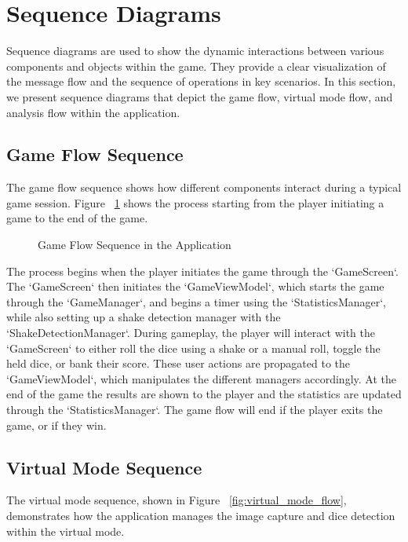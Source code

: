 \section{Sequence Diagrams}

Sequence diagrams are used to show the dynamic interactions between various components and objects within the game. They provide a clear visualization of the message flow and the sequence of operations in key scenarios. In this section, we present sequence diagrams that depict the game flow, virtual mode flow, and analysis flow within the application.

\subsection{Game Flow Sequence}

The game flow sequence shows how different components interact during a typical game session. Figure ~\ref{fig:game_flow} shows the process starting from the player initiating a game to the end of the game.

\begin{figure}[ht!]
    \centering
    
    \caption{Game Flow Sequence in the Application}
    \label{fig:game_flow}
\end{figure}

The process begins when the player initiates the game through the `GameScreen`. The `GameScreen` then initiates the `GameViewModel`, which starts the game through the `GameManager`, and begins a timer using the `StatisticsManager`, while also setting up a shake detection manager with the `ShakeDetectionManager`. During gameplay, the player will interact with the `GameScreen` to either roll the dice using a shake or a manual roll, toggle the held dice, or bank their score. These user actions are propagated to the `GameViewModel`, which manipulates the different managers accordingly. At the end of the game the results are shown to the player and the statistics are updated through the `StatisticsManager`. The game flow will end if the player exits the game, or if they win.

\subsection{Virtual Mode Sequence}

The virtual mode sequence, shown in Figure ~\ref{fig:virtual_mode_flow}, demonstrates how the application manages the image capture and dice detection within the virtual mode.

